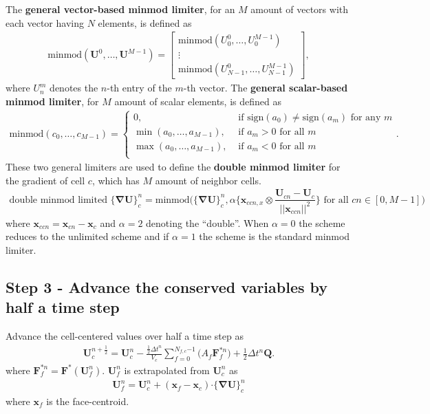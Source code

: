 \documentclass[10pt,letterpaper,notitlepage]{article}
\numberwithin{equation}{section}
\newcommand{\bnabla}{\boldsymbol{\nabla}}
\newcommand{\position}{\mathbf{x}}
\newcommand{\dotp}{\boldsymbol{\cdot}}
\newcommand{\beqn}{\begin{equation}\begin{aligned}}
\newcommand{\eeqn}{\end{aligned}\end{equation}}
\begin{document}
The \textbf{general vector-based minmod limiter}, for an $M$ amount of vectors with each vector having $N$ elements, is defined as
\beqn
\text{minmod}(\mathbf{U}^0, \dots, \mathbf{U}^{M-1}) = 
\begin{bmatrix}
	\text{minmod}(U_0^0, \dots, U_0^{M-1}) \\
	\vdots \\
	\text{minmod}(U_{N-1}^0, \dots, U_{N-1}^{M-1})
\end{bmatrix},
\eeqn 
where $U_n^m$ denotes the $n$-th entry of the $m$-th vector. The \textbf{general scalar-based minmod limiter}, for $M$ amount of scalar elements, is defined as
\beqn 
\text{minmod}(c_0, \dots, c_{M-1}) = 
\begin{cases}
	0, &\text{ if } \text{sign}(a_0) \ne  \text{sign}(a_m) \text{ for any } m \\
	\min(a_0, \dots, a_{M-1}), &\text{ if } a_m > 0 \text{ for all } m \\
	\max(a_0, \dots, a_{M-1}), &\text{ if } a_m < 0 \text{ for all } m \\
\end{cases}.
\eeqn 
These two general limiters are used to define the \textbf{double minmod limiter} for the gradient of cell $c$, which has $M$ amount of neighbor cells.
\beqn 
\text{double minmod limited }\big\{ \bnabla \mathbf{U} \big\}_c^n = 
	\text{minmod}\biggr(
	\big\{ \bnabla \mathbf{U} \big\}_{c}^n,
	\alpha \bigg\{ \position_{ccn,x} \otimes
	\dfrac{\mathbf{U}_{cn} - \mathbf{U}_c}{||\position_{ccn}||^2} \bigg\} \text{ for all } cn\in[0,M-1]
	\biggr) 
\eeqn 
where $\position_{ccn} = \position_{cn} - \position_c$ and $\alpha{=2}$ denoting the ``double''. When $\alpha{=0}$ the scheme reduces to the unlimited scheme and if $\alpha{=1}$ the scheme is the standard minmod limiter.

\vspace{1cm}
\subsection{Step 3 - Advance the conserved variables by half a time step}
Advance the cell-centered values over half a time step as
\beqn 
\mathbf{U}_c^{n{+}\frac{1}{2}} = \mathbf{U}_c^n - \frac{\frac{1}{2}\Delta t^n}{V_c} \sum_{f=0}^{N_{f,c}{-1}} 
\biggr(
A_f \mathbf{F}_f^{*n}
\biggr)
+ \frac{1}{2}\Delta t^n \mathbf{Q}.
\eeqn 
where $\mathbf{F}_f^{*n} = \mathbf{F}^*(\mathbf{U}_f^n) $. $\mathbf{U}_f^n$ is extrapolated from $\mathbf{U}_c^n$ as
\beqn 
\mathbf{U}_f^{n} = \mathbf{U}_c^{n}  + (\position_{f} - \position_c) \dotp \big\{ \bnabla \mathbf{U} \big\}_c^n
\eeqn 
where $\position_f$ is the face-centroid.
\end{document}
